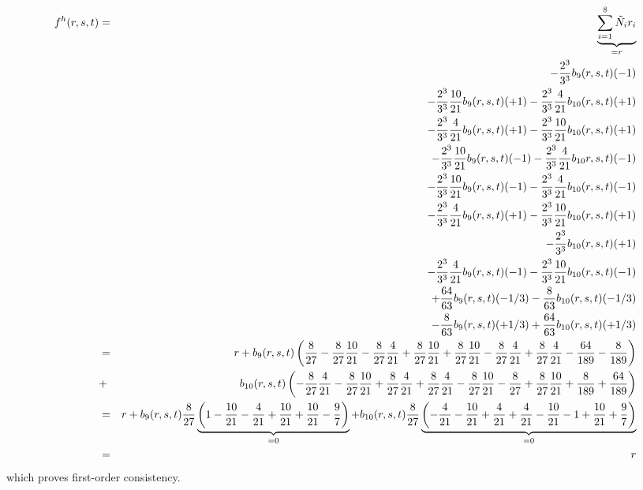 \begin{eqnarray}
f^h(r,s,t)
&=& \underbrace{\sum_{i=1}^8 \tilde{N}_i r_i }_{=r} \nonumber\\
&& -\frac{2^3}{3^3}b_9(r,s,t) (-1)  \nonumber\\
&& -\frac{2^3}{3^3}\frac{10}{21} b_9(r,s,t) (+1) - \frac{2^3}{3^3}\frac{4}{21} b_{10}(r,s,t) (+1)  \nonumber\\
&& -\frac{2^3}{3^3}\frac{4}{21} b_9(r,s,t)  (+1)-\frac{2^3}{3^3}\frac{10}{21} b_{10}(r,s,t) (+1)     \nonumber\\
&&-\frac{2^3}{3^3}\frac{10}{21} b_{9}(r,s,t) (-1) -\frac{2^3}{3^3}\frac{4}{21} b_{10}r,s,t) (-1)     \nonumber\\
&&- \frac{2^3}{3^3}\frac{10}{21} b_{9}(r,s,t) (-1) -\frac{2^3}{3^3}\frac{4}{21} b_{10}(r,s,t)  (-1)    \nonumber\\
&& -\frac{2^3}{3^3}\frac{4}{21} b_9(r,s,t) (+1) -\frac{2^3}{3^3}\frac{10}{21} b_{10}(r,s,t) (+1)  \nonumber\\
&& - \frac{2^3}{3^3}b_{10}(r,s,t) (+1)     \nonumber\\
&&-\frac{2^3}{3^3}\frac{4}{21} b_9(r,s,t) (-1) -\frac{2^3}{3^3}\frac{10}{21} b_{10}(r,s,t) (-1)      \nonumber\\
&& +  \frac{64}{63}b_9(r,s,t)(-1/3) -\frac{8}{63} b_{10}(r,s,t) (-1/3)     \nonumber\\
&&  -\frac{8}{63} b_{9}(r,s,t)(+1/3)  + \frac{64}{63}b_{10}(r,s,t)   (+1/3) \nonumber\\
&=& r + 
b_9(r,s,t) \left( 
\frac{8}{27} -\frac{8}{27}\frac{10}{21} -\frac{8}{27}\frac{4}{21} 
+\frac{8}{27}\frac{10}{21}
+\frac{8}{27}\frac{10}{21} 
-\frac{8}{27}\frac{4}{21}  
+\frac{8}{27}\frac{4}{21}
-\frac{64}{189}-\frac{8}{189}
\right) \nonumber\\ 
&+& b_{10}(r,s,t) \left(
-\frac{8}{27} \frac{4}{21} 
-\frac{8}{27}\frac{10}{21} 
+ \frac{8}{27}\frac{4}{21} 
+ \frac{8}{27}\frac{4}{21} 
-\frac{8}{27}\frac{10}{21} 
-\frac{8}{27}
+\frac{8}{27}\frac{10}{21}
+\frac{8}{189}
+\frac{64}{189}
\right) \nonumber\\
&=& r +  
b_9(r,s,t) \frac{8}{27} 
\underbrace{\left( 1 - \frac{10}{21} - \frac{4}{21} + \frac{10}{21} + \frac{10}{21} 
-\frac{9}{7} \right)}_{=0}
+b_{10}(r,s,t) \frac{8}{27} 
\underbrace{\left( 
- \frac{4}{21} -\frac{10}{21} + \frac{4}{21} + \frac{4}{21} - \frac{10}{21} -1 +  \frac{10}{21} + \frac{9}{7}
\right)}_{=0} \nonumber\\
&=& r 
\end{eqnarray}
which proves first-order consistency.





